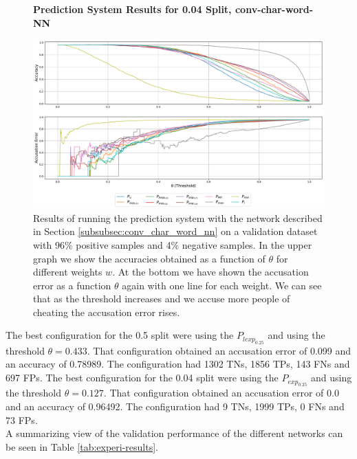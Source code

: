 \begin{figure}
    \centering
    \textbf{Prediction System Results for 0.04 Split, \glsdesc{conv-char-word-NN}}\par\medskip
    \includegraphics[scale=0.33]{./pictures/experiments/conv_char_word_nn/prediction_system_04}
    \caption{Results of running the prediction system with the network described
        in Section \ref{subsubsec:conv_char_word_nn} on a validation dataset
        with 96\% positive samples and 4\% negative samples. In the upper graph
        we show the accuracies obtained as a function of $\theta$ for different
        weights $w$. At the bottom we have shown the accusation error as a
        function $\theta$ again with one line for each weight. We can see that
        as the threshold increases and we accuse more people of cheating the
        accusation error rises.}
    \label{fig:conv-char-word-NN-pred-4}
\end{figure}

The best configuration for the 0.5 split were using the $P_{lexp_{0.25}}$ and
using the threshold $\theta = 0.433$. That configuration obtained an accusation
error of 0.099 and an accuracy of 0.78989. The configuration had 1302 \gls{TN}s,
1856 \gls{TP}s, 143 \gls{FN}s and 697 \gls{FP}s. The best configuration for the
0.04 split were using the $P_{exp_{0.25}}$ and using the threshold $\theta =
0.127$. That configuration obtained an accusation error of 0.0 and an accuracy
of 0.96492. The configuration had 9 \gls{TN}s, 1999 \gls{TP}s, 0 \gls{FN}s and
73 \gls{FP}s.\\

A summarizing view of the validation performance of the different networks can
be seen in Table \ref{tab:experi-results}.

